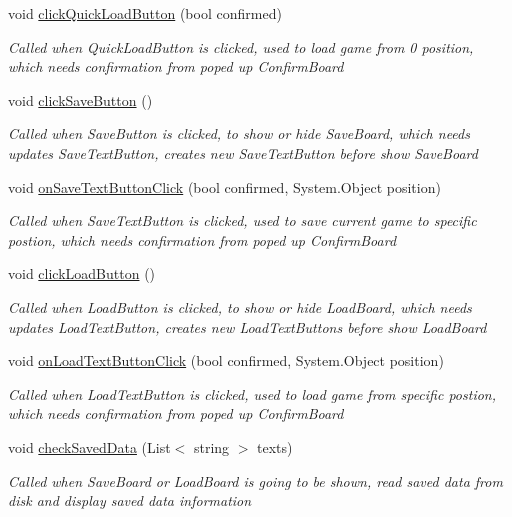 \begin{DoxyCompactItemize}
void \hyperlink{class_world_control_a111e414ac0160d8c23a3a16660f1de68}{click\+Quick\+Load\+Button} (bool confirmed)
\begin{DoxyCompactList}\small\item\em Called when Quick\+Load\+Button is clicked, used to load game from 0 position, which needs confirmation from poped up Confirm\+Board \end{DoxyCompactList}\item 
void \hyperlink{class_world_control_aa5146c1b9154a701c63ed09b6ad996f5}{click\+Save\+Button} ()
\begin{DoxyCompactList}\small\item\em Called when Save\+Button is clicked, to show or hide Save\+Board, which needs updates Save\+Text\+Button, creates new Save\+Text\+Button before show Save\+Board \end{DoxyCompactList}\item 
void \hyperlink{class_world_control_a4deccd456be82aeee5b1bcf63a450127}{on\+Save\+Text\+Button\+Click} (bool confirmed, System.\+Object position)
\begin{DoxyCompactList}\small\item\em Called when Save\+Text\+Button is clicked, used to save current game to specific postion, which needs confirmation from poped up Confirm\+Board \end{DoxyCompactList}\item 
void \hyperlink{class_world_control_aac00c4b9104aaac8856742e80c78bb02}{click\+Load\+Button} ()
\begin{DoxyCompactList}\small\item\em Called when Load\+Button is clicked, to show or hide Load\+Board, which needs updates Load\+Text\+Button, creates new Load\+Text\+Buttons before show Load\+Board \end{DoxyCompactList}\item 
void \hyperlink{class_world_control_aca2bcd2390e1823074e01acacb8bf012}{on\+Load\+Text\+Button\+Click} (bool confirmed, System.\+Object position)
\begin{DoxyCompactList}\small\item\em Called when Load\+Text\+Button is clicked, used to load game from specific postion, which needs confirmation from poped up Confirm\+Board \end{DoxyCompactList}\item 
void \hyperlink{class_world_control_a99f56eac1a154c36f6339a1d2c9c3559}{check\+Saved\+Data} (List$<$ string $>$ texts)
\begin{DoxyCompactList}\small\item\em Called when Save\+Board or Load\+Board is going to be shown, read saved data from disk and display saved data information \end{DoxyCompactList}\item 

\end{DoxyCompactItemize}

